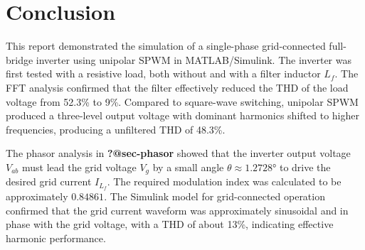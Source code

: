 \documentclass[
  letterpaper,
  DIV=11,
  numbers=noendperiod,
  oneside]{scrreprt}
\begin{document}
\section*{Conclusion}\label{sec-conclusion}


This report demonstrated the simulation of a single-phase grid-connected
full-bridge inverter using unipolar SPWM in MATLAB/Simulink. The
inverter was first tested with a resistive load, both without and with a
filter inductor \(L_f\). The FFT analysis confirmed that the filter
effectively reduced the THD of the load voltage from 52.3\% to 9\%.
Compared to square-wave switching, unipolar SPWM produced a three-level
output voltage with dominant harmonics shifted to higher frequencies,
producing a unfiltered THD of 48.3\%.

The phasor analysis in \textbf{?@sec-phasor} showed that the inverter
output voltage \(V_{ab}\) must lead the grid voltage \(V_g\) by a small
angle \(\theta \approx 1.2728°\) to drive the desired grid current
\(I_{L_f}\). The required modulation index was calculated to be
approximately \(0.84861\). The Simulink model for grid-connected
operation confirmed that the grid current waveform was approximately
sinusoidal and in phase with the grid voltage, with a THD of about 13\%,
indicating effective harmonic performance.
\end{document}
